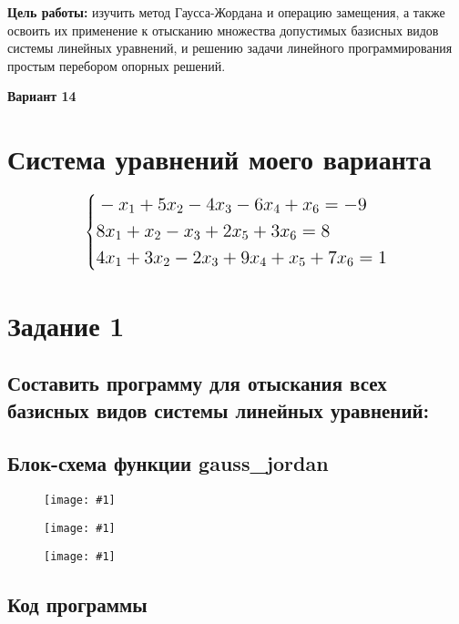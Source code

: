 \documentclass{report}
\newcommand{\drawzalupa}[2]{
	\begin{figure}[H]
		\centering
		\texttt{[image: \#1]}
	\end{figure}
}
\begin{document}
	\textbf{Цель работы:} изучить метод Гаусса-Жордана и операцию
	замещения, а также освоить их применение к отысканию множества
	допустимых базисных видов системы линейных уравнений, и решению
	задачи линейного программирования простым перебором опорных
	решений.
	\begin{center}
		\textbf{Вариант 14}
	\end{center}
	\bigbreak
	\tableofcontents
	
	\chapter{Система уравнений моего варианта}
	
	\[
	\Large\left\{
	\begin{aligned}
		&-x_1 + 5x_2 - 4x_3 - 6x_4 + x_6 = -9 \\
		&8x_1 + x_2 - x_3 + 2x_5 + 3x_6 = 8 \\
		&4x_1 + 3x_2 - 2x_3 + 9x_4 + x_5 + 7x_6 = 1
	\end{aligned}
	\right.
	\]
	
	
	
	\chapter{Задание 1}
	\section{Составить программу для отыскания всех базисных видов системы
		линейных уравнений:}
	
	\section{Блок-схема функции gauss\_jordan}
	
	\drawzalupa{images/block1.png}{0.61}
	
	\newpage
	
	\drawzalupa{images/block2.png}{0.9}
	
	\newpage
	
	\drawzalupa{images/block3.png}{0.9}
	
	\section{Код программы}
	
\end{document}
